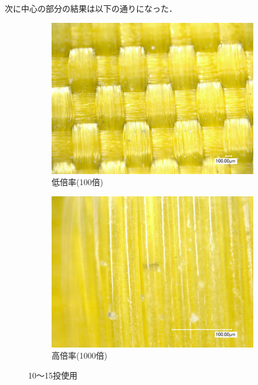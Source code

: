 \documentclass[main]{subfiles}
\begin{document}
次に中心の部分の結果は以下の通りになった．

\begin{figure}[H]
    \centering
    \begin{subfigure}[htbp]{0.45\linewidth}
        \centering
        \includegraphics[keepaspectratio, width=0.8\linewidth]{figures/中心/カーリングパッド10-15低倍率.jpg}
        \caption{低倍率(100倍)}
        \label{fig:label}
    \end{subfigure}
    \begin{subfigure}[htbp]{0.45\linewidth}
        \centering
        \includegraphics[keepaspectratio, width=0.8\linewidth]{figures/中心/カーリングパッド10-15.jpg}
        \caption{高倍率(1000倍)}
        \label{fig:label}
    \end{subfigure}
    \caption{10～15投使用}
    \label{fig:6}
\end{figure}
\end{document}
